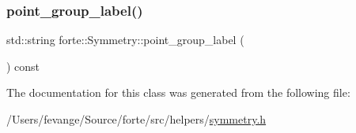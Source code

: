 \mbox{\label{classforte_1_1_symmetry_ab9c2019b0541fdd302d017a3bf7c8b81}} 
\subsubsection{\texorpdfstring{point\+\_\+group\+\_\+label()}{point\_group\_label()}}
{\footnotesize\ttfamily std\+::string forte\+::\+Symmetry\+::point\+\_\+group\+\_\+label (\begin{DoxyParamCaption}{ }\end{DoxyParamCaption}) const\hspace{0.3cm}{\ttfamily [inline]}}



The documentation for this class was generated from the following file\+:\begin{DoxyCompactItemize}
\item 
/\+Users/fevange/\+Source/forte/src/helpers/\mbox{\hyperlink{symmetry_8h}{symmetry.\+h}}\end{DoxyCompactItemize}
